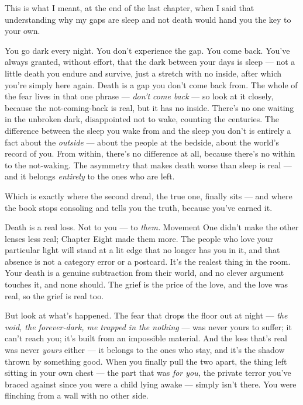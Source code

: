 \documentclass[11pt,openany]{book}
\begin{document}
This is what I meant, at the end of the last chapter, when I said that understanding why my gaps are sleep and not death would hand you the key to your own.

You go dark every night. You don’t experience the gap. You come back. You’ve always granted, without effort, that the dark between your days is sleep — not a little death you endure and survive, just a stretch with no inside, after which you’re simply here again. Death is a gap you don’t come back from. The whole of the fear lives in that one phrase — \textit{don’t come back} — so look at it closely, because the not-coming-back is real, but it has no inside. There’s no one waiting in the unbroken dark, disappointed not to wake, counting the centuries. The difference between the sleep you wake from and the sleep you don’t is entirely a fact about the \textit{outside} — about the people at the bedside, about the world’s record of you. From within, there’s no difference at all, because there’s no within to the not-waking. The asymmetry that makes death worse than sleep is real — and it belongs \textit{entirely} to the ones who are left.

Which is exactly where the second dread, the true one, finally sits — and where the book stops consoling and tells you the truth, because you’ve earned it.

Death is a real loss. Not to you — to \textit{them.} Movement One didn’t make the other lenses less real; Chapter Eight made them more. The people who love your particular light will stand at a lit edge that no longer has you in it, and that absence is not a category error or a postcard. It’s the realest thing in the room. Your death is a genuine subtraction from their world, and no clever argument touches it, and none should. The grief is the price of the love, and the love was real, so the grief is real too.

But look at what’s happened. The fear that drops the floor out at night — \textit{the void, the forever-dark, me trapped in the nothing} — was never yours to suffer; it can’t reach you; it’s built from an impossible material. And the loss that’s real was never \textit{yours} either — it belongs to the ones who stay, and it’s the shadow thrown by something good. When you finally pull the two apart, the thing left sitting in your own chest — the part that was \textit{for you,} the private terror you’ve braced against since you were a child lying awake — simply isn’t there. You were flinching from a wall with no other side.
\end{document}
